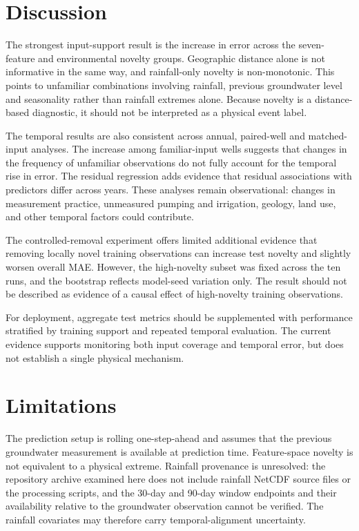 \documentclass[conference]{IEEEtran}
\begin{document}
\section{Discussion}
The strongest input-support result is the increase in error across the seven-feature and environmental novelty groups. Geographic distance alone is not informative in the same way, and rainfall-only novelty is non-monotonic. This points to unfamiliar combinations involving rainfall, previous groundwater level and seasonality rather than rainfall extremes alone. Because novelty is a distance-based diagnostic, it should not be interpreted as a physical event label.

The temporal results are also consistent across annual, paired-well and matched-input analyses. The increase among familiar-input wells suggests that changes in the frequency of unfamiliar observations do not fully account for the temporal rise in error. The residual regression adds evidence that residual associations with predictors differ across years. These analyses remain observational: changes in measurement practice, unmeasured pumping and irrigation, geology, land use, and other temporal factors could contribute.

The controlled-removal experiment offers limited additional evidence that removing locally novel training observations can increase test novelty and slightly worsen overall MAE. However, the high-novelty subset was fixed across the ten runs, and the bootstrap reflects model-seed variation only. The result should not be described as evidence of a causal effect of high-novelty training observations.

For deployment, aggregate test metrics should be supplemented with performance stratified by training support and repeated temporal evaluation. The current evidence supports monitoring both input coverage and temporal error, but does not establish a single physical mechanism.

\section{Limitations}
The prediction setup is rolling one-step-ahead and assumes that the previous groundwater measurement is available at prediction time. Feature-space novelty is not equivalent to a physical extreme. Rainfall provenance is unresolved: the repository archive examined here does not include rainfall NetCDF source files or the processing scripts, and the 30-day and 90-day window endpoints and their availability relative to the groundwater observation cannot be verified. The rainfall covariates may therefore carry temporal-alignment uncertainty.
\end{document}
